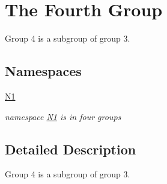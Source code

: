 \hypertarget{group__group4}{}\section{The Fourth Group}
\label{group__group4}


Group 4 is a subgroup of group 3.  


\subsection*{Namespaces}
\begin{DoxyCompactItemize}
\item 
 \mbox{\hyperlink{namespace_n1}{N1}}
\begin{DoxyCompactList}\small\item\em namespace \mbox{\hyperlink{namespace_n1}{N1}} is in four groups \end{DoxyCompactList}\end{DoxyCompactItemize}


\subsection{Detailed Description}
Group 4 is a subgroup of group 3. 

